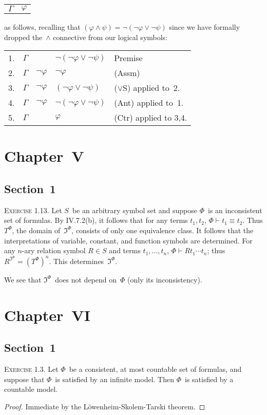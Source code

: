 \documentclass[letterpaper]{article}
\newcommand{\lequ}{\equiv}
\newcommand{\I}{\mathfrak{I}}
\newcommand{\proves}{\vdash}
\theoremstyle{remark}
\begin{document}
\begin{enumerate}
\begin{center}
\begin{tabular}{ll}
\hline
$\Gamma$&$\varphi$
\end{tabular}
\end{center}
as follows, recalling that $(\varphi\land\psi)=\lnot(\lnot\varphi\lor\lnot\psi)$ since we have formally dropped the~$\land$ connective from our logical symbols:
\begin{center}
\begin{tabular}{rllll}
1.&$\Gamma$&&$\lnot(\lnot\varphi\lor\lnot\psi)$&Premise\\
2.&$\Gamma$&$\lnot\varphi$&$\lnot\varphi$&(Assm)\\
3.&$\Gamma$&$\lnot\varphi$&$(\lnot\varphi\lor\lnot\psi)$&($\lor$S) applied to~2.\\
4.&$\Gamma$&$\lnot\varphi$&$\lnot(\lnot\varphi\lor\lnot\psi)$&(Ant) applied to~1.\\
5.&$\Gamma$&&$\varphi$&(Ctr) applied to 3,4.
\end{tabular}
\end{center}
\end{enumerate}

\section*{Chapter~V}

\subsection*{Section~1}
\noindent\textsc{Exercise 1.13.}
Let $S$~be an arbitrary symbol set and suppose $\Phi$~is an inconsistent set of formulas. By IV.7.2(b), it follows that for any terms $t_1,t_2$, $\Phi\proves t_1\lequ t_2$. Thus $T^\Phi$, the domain of~$\I^\Phi$, consists of only one equivalence class. It follows that the interpretations of variable, constant, and function symbols are determined. For any $n$-ary relation symbol $R\in S$ and terms $t_1,\ldots,t_n$, $\Phi\proves Rt_1\cdots t_n$; thus $R^{\I^\Phi}=(T^\Phi)^n$. This determines~$\I^\Phi$.

We see that $\I^\Phi$~does not depend on~$\Phi$ (only its inconsistency).

\section*{Chapter~VI}

\subsection*{Section~1}
\noindent\textsc{Exercise 1.3.}
Let $\Phi$~be a consistent, at most countable set of formulas, and suppose that $\Phi$~is satisfied by an infinite model. Then $\Phi$~is satisfied by a countable model.
\begin{proof}
Immediate by the L\"owenheim-Skolem-Tarski theorem.
\end{proof}
\end{document}

